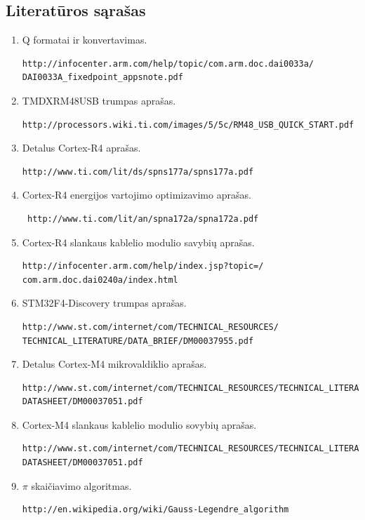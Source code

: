 \documentclass[a4paper, 12pt]{article} %
\begin{document}
\begin{onehalfspacing}





\section*{Literat\={u}ros s\k{a}ra\v{s}as}
\begin{enumerate}
\item  Q formatai ir konvertavimas. \begin{verbatim}http://infocenter.arm.com/help/topic/com.arm.doc.dai0033a/
DAI0033A_fixedpoint_appsnote.pdf\end{verbatim}
\item TMDXRM48USB trumpas apra\v{s}as. \begin{verbatim}http://processors.wiki.ti.com/images/5/5c/RM48_USB_QUICK_START.pdf\end{verbatim}
\item Detalus Cortex-R4 apra\v{s}as. \begin{verbatim}http://www.ti.com/lit/ds/spns177a/spns177a.pdf\end{verbatim}
\item Cortex-R4 energijos vartojimo optimizavimo apra\v{s}as.\begin{verbatim} http://www.ti.com/lit/an/spna172a/spna172a.pdf\end{verbatim}
\item Cortex-R4 slankaus kablelio modulio savybi\k{u} apra\v{s}as. \begin{verbatim}http://infocenter.arm.com/help/index.jsp?topic=/
com.arm.doc.dai0240a/index.html\end{verbatim}
\item STM32F4-Discovery trumpas apra\v{s}as. \begin{verbatim}http://www.st.com/internet/com/TECHNICAL_RESOURCES/
TECHNICAL_LITERATURE/DATA_BRIEF/DM00037955.pdf\end{verbatim}
\item Detalus Cortex-M4 mikrovaldiklio apra\v{s}as. \begin{verbatim}http://www.st.com/internet/com/TECHNICAL_RESOURCES/TECHNICAL_LITERATURE/
DATASHEET/DM00037051.pdf\end{verbatim}
\item Cortex-M4 slankaus kablelio modulio sovybi\k{u} apra\v{s}as. \begin{verbatim}http://www.st.com/internet/com/TECHNICAL_RESOURCES/TECHNICAL_LITERATURE/
DATASHEET/DM00037051.pdf\end{verbatim}
\item $\pi$ skai\v{c}iavimo algoritmas. \begin{verbatim}http://en.wikipedia.org/wiki/Gauss-Legendre_algorithm\end{verbatim}
\end{enumerate}


\end{onehalfspacing}
\end{document}
